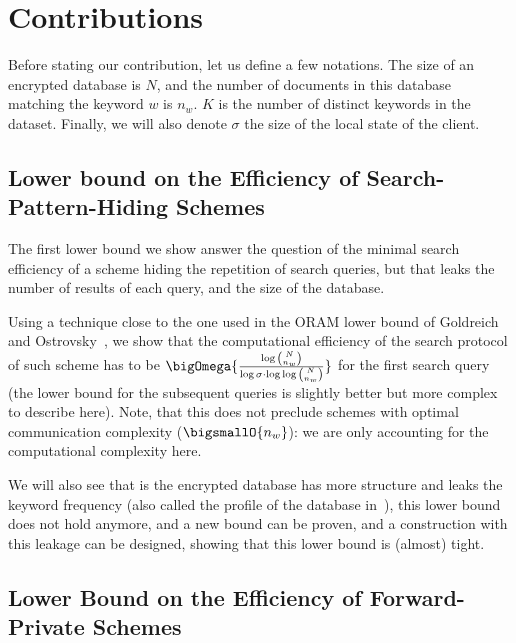 

\section{Contributions} %
\label{sec:contributions}

Before stating our contribution, let us define a few notations.
The size of an encrypted database is $N$, and the number of documents in this database matching the keyword $w$ is $n_w$.
$K$ is the number of distinct keywords in the dataset. 
Finally, we will also denote $\sigma$ the size of the local state of the client. 


\subsection{Lower bound on the Efficiency of Search-Pattern-Hiding Schemes} %
\label{sub:search_pat_lb}

The first lower bound we show answer the question of the minimal search efficiency of a scheme hiding the repetition of search queries, but that leaks the number of results of each query, and the size of the database.

Using a technique close to the one used in the ORAM lower bound of Goldreich and Ostrovsky~\cite{JACM:GO96}, we show that the computational efficiency of the search protocol of such scheme has to be 
\(
		\bigOmega{\frac{\log \binom{N}{n_w}}{\log \sigma \cdot \log \log  \binom{N}{n_w}}}
\)
for the first search query (the lower bound for the subsequent queries is slightly better but more complex to describe here).
Note, that this does not preclude schemes with optimal communication complexity ($\bigsmallO{n_w}$): we are only accounting for the computational complexity here.

We will also see that is the encrypted database has more structure and leaks the keyword frequency (also called the profile of the database in~\cite{EC:CasTes14}), this lower bound does not hold anymore, and a new bound can be proven, and a construction with this leakage can be designed, showing that this lower bound is (almost) tight.



\subsection{Lower Bound on the Efficiency of Forward-Private Schemes} %
\label{sub:fp_lb}

